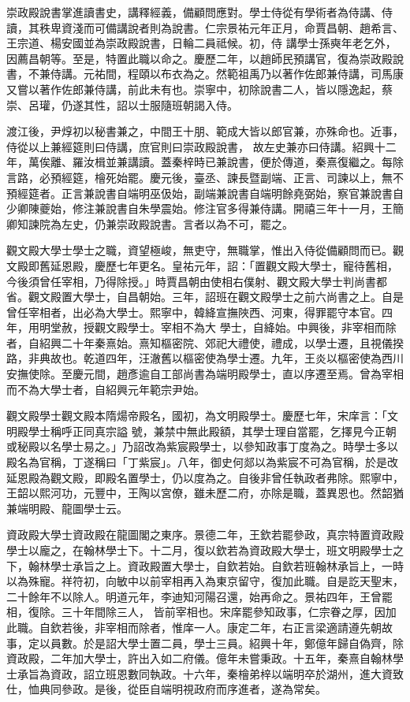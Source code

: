 \begin{pinyinscope}
 崇政殿說書掌進讀書史，講釋經義，備顧問應對。學士侍從有學術者為侍講、侍讀，其秩卑資淺而可備講說者則為說書。仁宗景祐元年正月，命賈昌朝、趙希言、王宗道、楊安國並為崇政殿說書，日輪二員祗候。初，侍
 講學士孫奭年老乞外，因薦昌朝等。至是，特置此職以命之。慶歷二年，以趙師民預講官，復為崇政殿說書，不兼侍講。元祐間，程頤以布衣為之。然範祖禹乃以著作佐郎兼侍講，司馬康又嘗以著作佐郎兼侍講，前此未有也。崇寧中，初除說書二人，皆以隱逸起，蔡崇、呂瓘，仍遂其性，詔以士服隨班朝謁入侍。



 渡江後，尹焞初以秘書兼之，中間王十朋、範成大皆以郎官兼，亦殊命也。近事，侍從以上兼經筵則曰侍講，庶官則曰崇政殿說書，
 故左史兼亦曰侍講。紹興十二年，萬俟離、羅汝楫並兼講讀。蓋秦梓時已兼說書，便於傳道，秦熹復繼之。每除言路，必預經筵，檜死始罷。慶元後，臺丞、諫長暨副端、正言、司諫以上，無不預經筵者。正言兼說書自端明巫伋始，副端兼說書自端明餘堯弼始，察官兼說書自少卿陳夔始，修注兼說書自朱學震始。修注官多得兼侍講。開禧三年十一月，王簡卿知諫院為左史，仍兼崇政殿說書。言者以為不可，罷之。



 觀文殿大學士學士之職，資望極峻，無吏守，無職掌，惟出入侍從備顧問而已。觀文殿即舊延恩殿，慶歷七年更名。皇祐元年，詔：「置觀文殿大學士，寵待舊相，今後須曾任宰相，乃得除授。」時賈昌朝由使相右僕射、觀文殿大學士判尚書都省。觀文殿置大學士，自昌朝始。三年，詔班在觀文殿學士之前六尚書之上。自是曾任宰相者，出必為大學士。熙寧中，韓絳宣撫陜西、河東，得罪罷守本官。四年，用明堂赦，授觀文殿學士。宰相不為大
 學士，自絳始。中興後，非宰相而除者，自紹興二十年秦熹始。熹知樞密院、郊祀大禮使，禮成，以學士遷，且視儀揆路，非典故也。乾道四年，汪澈舊以樞密使為學士遷。九年，王炎以樞密使為西川安撫使除。至慶元間，趙彥逾自工部尚書為端明殿學士，直以序遷至焉。曾為宰相而不為大學士者，自紹興元年範宗尹始。



 觀文殿學士觀文殿本隋煬帝殿名，國初，為文明殿學士。慶歷七年，宋庠言：「文明殿學士稱呼正同真宗謚
 號，兼禁中無此殿額，其學士理自當罷，乞擇見今正朝或秘殿以名學士易之。」乃詔改為紫宸殿學士，以參知政事丁度為之。時學士多以殿名為官稱，丁遂稱曰「丁紫宸」。八年，御史何郯以為紫宸不可為官稱，於是改延恩殿為觀文殿，即殿名置學士，仍以度為之。自後非曾任執政者弗除。熙寧中，王韶以熙河功，元豐中，王陶以宮僚，雖未歷二府，亦除是職，蓋異恩也。然韶猶兼端明殿、龍圖學士云。



 資政殿大學士資政殿在龍圖閣之東序。景德二年，王欽若罷參政，真宗特置資政殿學士以龐之，在翰林學士下。十二月，復以欽若為資政殿大學士，班文明殿學士之下，翰林學士承旨之上。資政殿置大學士，自欽若始。自欽若班翰林承旨上，一時以為殊寵。祥符初，向敏中以前宰相再入為東京留守，復加此職。自是訖天聖末，二十餘年不以除人。明道元年，李迪知河陽召還，始再命之。景祐四年，王曾罷相，復除。三十年間除三人，
 皆前宰相也。宋庠罷參知政事，仁宗眷之厚，因加此職。自欽若後，非宰相而除者，惟庠一人。康定二年，右正言梁適請遵先朝故事，定以員數。於是詔大學士置二員，學士三員。紹興十年，鄭億年歸自偽齊，除資政殿，二年加大學士，許出入如二府儀。億年未嘗秉政。十五年，秦熹自翰林學士承旨為資政，詔立班恩數同執政。十六年，秦檜弟梓以端明卒於湖州，進大資致仕，恤典同參政。是後，從臣自端明視政府而序進者，遂為常矣。




\end{pinyinscope}
